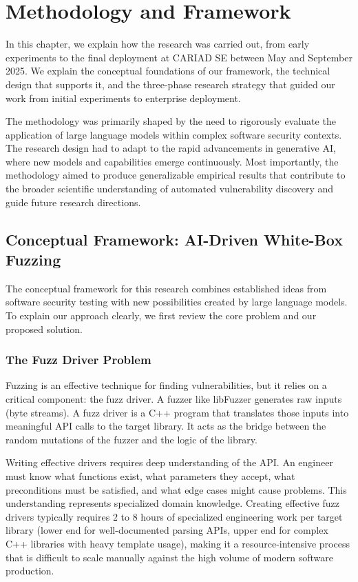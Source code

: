 
\chapter{Methodology and Framework}
\label{chap:methodology}

In this chapter, we explain how the research was carried out, from early experiments to the final deployment at CARIAD SE between May and September 2025. We explain the conceptual foundations of our framework, the technical design that supports it, and the three-phase research strategy that guided our work from initial experiments to enterprise deployment.

The methodology was primarily shaped by the need to rigorously evaluate the application of large language models within complex software security contexts. The research design had to adapt to the rapid advancements in generative AI, where new models and capabilities emerge continuously. Most importantly, the methodology aimed to produce generalizable empirical results that contribute to the broader scientific understanding of automated vulnerability discovery and guide future research directions.

\section{Conceptual Framework: AI-Driven White-Box Fuzzing}
\label{sec:meth_conceptual}

The conceptual framework for this research combines established ideas from software security testing with new possibilities created by large language models. To explain our approach clearly, we first review the core problem and our proposed solution.

\subsection{The Fuzz Driver Problem}
Fuzzing is an effective technique for finding vulnerabilities, but it relies on a critical component: the fuzz driver. A fuzzer like libFuzzer generates raw inputs (byte streams). A fuzz driver is a C++ program that translates those inputs into meaningful API calls to the target library. It acts as the bridge between the random mutations of the fuzzer and the logic of the library.

Writing effective drivers requires deep understanding of the API. An engineer must know what functions exist, what parameters they accept, what preconditions must be satisfied, and what edge cases might cause problems. This understanding represents specialized domain knowledge. Creating effective fuzz drivers typically requires 2 to 8 hours of specialized engineering work per target library (lower end for well-documented parsing APIs, upper end for complex C++ libraries with heavy template usage), making it a resource-intensive process that is difficult to scale manually against the high volume of modern software production.

